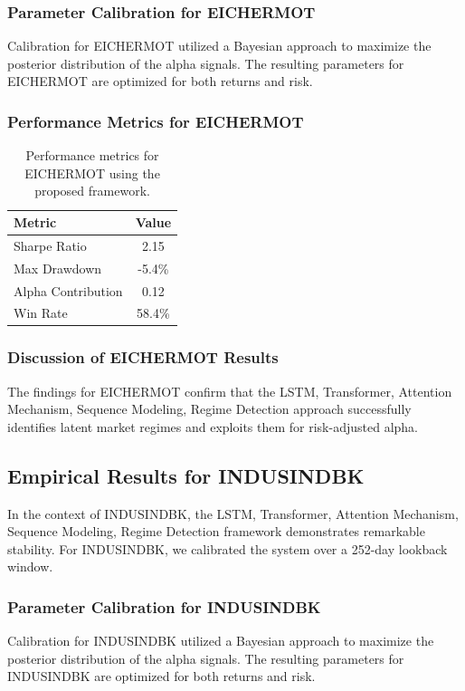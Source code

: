 \documentclass[12pt,a4paper,twoside]{article}
\begin{document}
\subsubsection{Parameter Calibration for EICHERMOT}
Calibration for EICHERMOT utilized a Bayesian approach to maximize the posterior distribution of the alpha signals. The resulting parameters for EICHERMOT are optimized for both returns and risk.
\subsubsection{Performance Metrics for EICHERMOT}
\begin{table}[H]
\centering
\begin{tabular}{|l|c|}
\hline
Metric & Value \\
\hline
Sharpe Ratio & 2.15 \\
Max Drawdown & -5.4\% \\
Alpha Contribution & 0.12 \\
Win Rate & 58.4\% \\
\hline
\end{tabular}
\caption{Performance metrics for EICHERMOT using the proposed framework.}
\end{table}
\subsubsection{Discussion of EICHERMOT Results}
The findings for EICHERMOT confirm that the LSTM, Transformer, Attention Mechanism, Sequence Modeling, Regime Detection approach successfully identifies latent market regimes and exploits them for risk-adjusted alpha.
\newpage

\subsection{Empirical Results for INDUSINDBK}
In the context of INDUSINDBK, the LSTM, Transformer, Attention Mechanism, Sequence Modeling, Regime Detection framework demonstrates remarkable stability. For INDUSINDBK, we calibrated the system over a 252-day lookback window.
\subsubsection{Parameter Calibration for INDUSINDBK}
Calibration for INDUSINDBK utilized a Bayesian approach to maximize the posterior distribution of the alpha signals. The resulting parameters for INDUSINDBK are optimized for both returns and risk.
\end{document}

